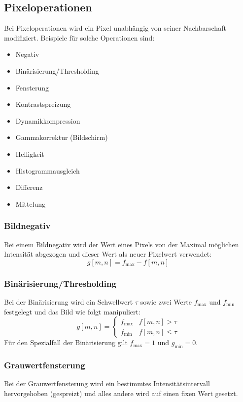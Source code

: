 		\subsection{Pixeloperationen}
			Bei Pixeloperationen wird ein Pixel unabhängig von seiner Nachbarschaft modifiziert. Beispiele für solche Operationen sind:
			\begin{itemize}
				\item Negativ
				\item Binärisierung/Thresholding
				\item Fensterung
				\item Kontrastspreizung
				\item Dynamikkompression
				\item Gammakorrektur (Bildschirm)
				\item Helligkeit
				\item Histogrammausgleich
				\item Differenz
				\item Mittelung
			\end{itemize}

			\subsubsection{Bildnegativ}
				Bei einem Bildnegativ wird der Wert eines Pixels von der Maximal möglichen Intensität abgezogen und dieser Wert als neuer Pixelwert verwendet:
				\begin{equation*}
					g[m, n] = f_\text{max} - f[m, n]
				\end{equation*}

			\subsubsection{Binärisierung/Thresholding}
				Bei der Binärisierung wird ein Schwellwert \(\tau\) sowie zwei Werte \(f_\text{max}\) und \(f_\text{min}\) festgelegt und das Bild wie folgt manipuliert:
				\begin{equation*}
					g[m, n] =
						\begin{cases}
							f_\text{max} & f[m, n] > \tau \\
							f_\text{min} & f[m, n] \leq \tau
						\end{cases}
				\end{equation*}
				Für den Spezialfall der Binärisierung gilt \( f_\text{max} = 1 \) und \( g_\text{min} = 0 \).

			\subsubsection{Grauwertfensterung}
				Bei der Grauwertfensterung wird ein bestimmtes Intensitätsintervall hervorgehoben (gespreizt) und alles andere wird auf einen fixen Wert gesetzt.
			
